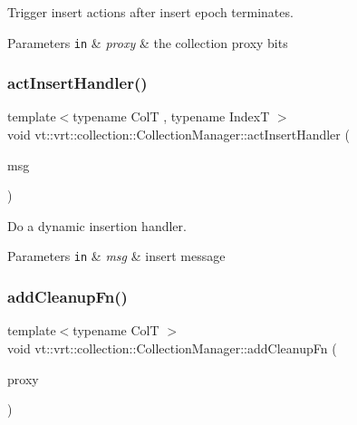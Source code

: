 Trigger insert actions after insert epoch terminates. 


\begin{DoxyParams}[1]{Parameters}
\mbox{\tt in}  & {\em proxy} & the collection proxy bits \\
\hline
\end{DoxyParams}
\mbox{\label{structvt_1_1vrt_1_1collection_1_1_collection_manager_a0c2b3a0d98264432181392ff178d5782}} 
\subsubsection{\texorpdfstring{act\+Insert\+Handler()}{actInsertHandler()}}
{\footnotesize\ttfamily template$<$typename ColT , typename IndexT $>$ \\
void vt\+::vrt\+::collection\+::\+Collection\+Manager\+::act\+Insert\+Handler (\begin{DoxyParamCaption}\item[{\hyperlink{structvt_1_1vrt_1_1collection_1_1_act_insert_msg}{Act\+Insert\+Msg}$<$ ColT, IndexT $>$ $\ast$}]{msg }\end{DoxyParamCaption})\hspace{0.3cm}{\ttfamily [static]}}



Do a dynamic insertion handler. 


\begin{DoxyParams}[1]{Parameters}
\mbox{\tt in}  & {\em msg} & insert message \\
\hline
\end{DoxyParams}
\mbox{\label{structvt_1_1vrt_1_1collection_1_1_collection_manager_a3ef00b90a3a2d066a7f83b9c32b301d2}} 
\subsubsection{\texorpdfstring{add\+Cleanup\+Fn()}{addCleanupFn()}}
{\footnotesize\ttfamily template$<$typename ColT $>$ \\
void vt\+::vrt\+::collection\+::\+Collection\+Manager\+::add\+Cleanup\+Fn (\begin{DoxyParamCaption}\item[{\hyperlink{namespacevt_a1b417dd5d684f045bb58a0ede70045ac}{Virtual\+Proxy\+Type}}]{proxy }\end{DoxyParamCaption})}



